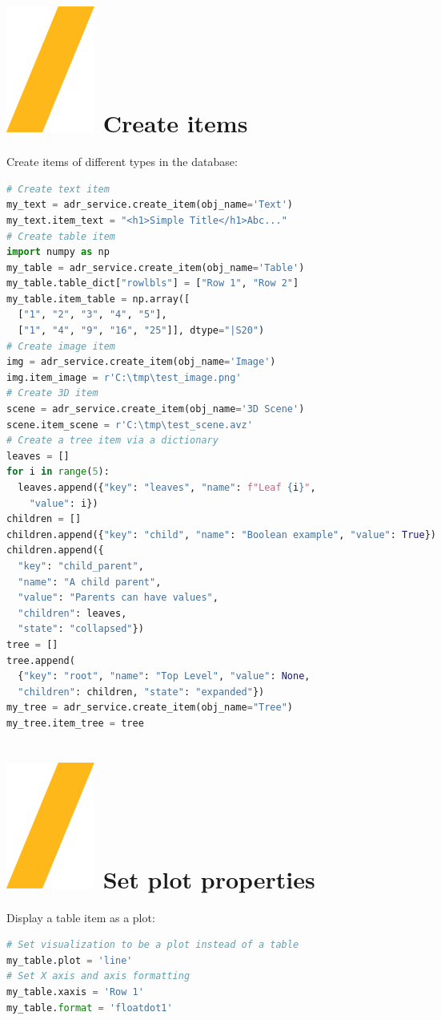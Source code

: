 \documentclass[9pt,landscape]{article}
\begin{document}
\begin{multicols}{3}
\section{\includegraphics[height=\fontcharht\font`\S]{slash.png}  Create items}
Create items of different types in the database:
\begin{lstlisting}[language=Python]
# Create text item
my_text = adr_service.create_item(obj_name='Text')
my_text.item_text = "<h1>Simple Title</h1>Abc..."
# Create table item
import numpy as np
my_table = adr_service.create_item(obj_name='Table')
my_table.table_dict["rowlbls"] = ["Row 1", "Row 2"]
my_table.item_table = np.array([
  ["1", "2", "3", "4", "5"], 
  ["1", "4", "9", "16", "25"]], dtype="|S20")
# Create image item
img = adr_service.create_item(obj_name='Image')
img.item_image = r'C:\tmp\test_image.png'
# Create 3D item
scene = adr_service.create_item(obj_name='3D Scene')
scene.item_scene = r'C:\tmp\test_scene.avz'
# Create a tree item via a dictionary
leaves = []
for i in range(5):
  leaves.append({"key": "leaves", "name": f"Leaf {i}",
    "value": i})
children = []
children.append({"key": "child", "name": "Boolean example", "value": True})
children.append({
  "key": "child_parent", 
  "name": "A child parent", 
  "value": "Parents can have values", 
  "children": leaves,
  "state": "collapsed"})
tree = []
tree.append(
  {"key": "root", "name": "Top Level", "value": None, 
  "children": children, "state": "expanded"})
my_tree = adr_service.create_item(obj_name="Tree")
my_tree.item_tree = tree
\end{lstlisting} 


\section{\includegraphics[height=\fontcharht\font`\S]{slash.png}  Set plot properties}
Display a table item as a plot:
\begin{lstlisting}[language=Python]
# Set visualization to be a plot instead of a table
my_table.plot = 'line'
# Set X axis and axis formatting
my_table.xaxis = 'Row 1'
my_table.format = 'floatdot1'
\end{lstlisting} 


\end{multicols}
\end{document}
